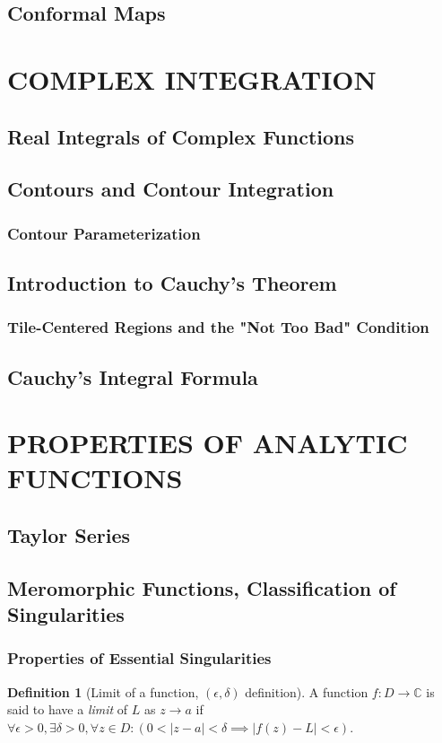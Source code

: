 \documentclass[hidelinks,12pt]{article}
\theoremstyle{definition}
\newtheorem{definition}{Definition}[section]
\newcommand{\modulus}[1]{\left|#1\right|} %
\begin{document}
  \subsection{Conformal Maps}


  \section{COMPLEX INTEGRATION}
  \subsection{Real Integrals of Complex Functions}
  \subsection{Contours and Contour Integration}
  \subsubsection{Contour Parameterization}
  \subsection{Introduction to Cauchy's Theorem}
  \subsubsection{Tile-Centered Regions and the "Not Too Bad" Condition}
  \subsection{Cauchy's Integral Formula}

  \section{PROPERTIES OF ANALYTIC FUNCTIONS}
  \subsection{Taylor Series}
  \subsection{Meromorphic Functions, Classification of Singularities}
  \subsubsection{Properties of Essential Singularities}

  \begin{definition}[Limit of a function, $(\epsilon, \delta)$ definition]
    \label{def:edlim}
    A function $f: D \to \mathbb{C}$ is said to have a \emph{limit} of $L$ as $z \to a$ if $\forall\epsilon > 0, \exists\delta > 0, \forall z \in D: (0 < \modulus{z-a} < \delta \implies \modulus{f(z)-L} < \epsilon)$.
  \end{definition}
\end{document}
